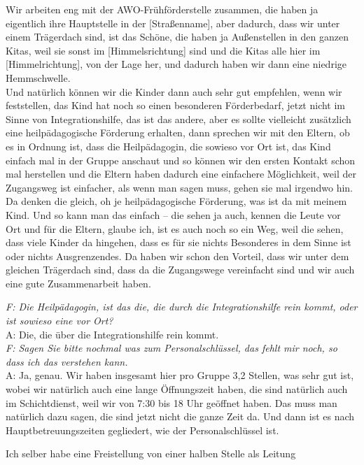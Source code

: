 \begin{linenumbers*}
Wir arbeiten eng mit der AWO-Frühförderstelle zusammen, die haben ja eigentlich ihre Hauptstelle in der [Straßenname], aber dadurch, dass wir unter einem Trägerdach sind, ist das Schöne, die haben ja Außenstellen in den ganzen Kitas, weil sie sonst im [Himmelsrichtung] sind und die Kitas alle hier im [Himmelrichtung], von der Lage her, und dadurch haben wir dann eine niedrige Hemmschwelle.\\
Und natürlich können wir die Kinder dann auch sehr gut empfehlen, wenn wir feststellen, das Kind hat noch so einen besonderen Förderbedarf, jetzt nicht im Sinne von Integrationshilfe, das ist das andere, aber es sollte vielleicht zusätzlich eine heilpädagogische Förderung erhalten, dann sprechen wir mit den Eltern, ob es in Ordnung ist, dass die Heilpädagogin, die sowieso vor Ort ist, das Kind einfach mal in der Gruppe anschaut und so können wir den ersten Kontakt schon mal herstellen und die Eltern haben dadurch eine einfachere Möglichkeit, weil der Zugangsweg ist einfacher, als wenn man sagen muss, gehen sie mal irgendwo hin.\\
Da denken die gleich, oh je heilpädagogische Förderung, was ist da mit meinem Kind. Und so kann man das einfach -- die sehen ja auch, kennen die Leute vor Ort und für die Eltern, glaube ich, ist es auch noch so ein Weg, weil die sehen, dass viele Kinder da hingehen, dass es für sie nichts Besonderes in dem Sinne ist oder nichts Ausgrenzendes. Da haben wir schon den Vorteil, dass wir unter dem gleichen Trägerdach sind, dass da die Zugangswege vereinfacht sind und wir auch eine gute Zusammenarbeit haben. 

\emph{F: Die Heilpädagogin, ist das die, die durch die Integrationshilfe rein kommt, oder ist sowieso eine vor Ort?}\\
A: Die, die über die Integrationshilfe rein kommt.\\

\emph{F: Sagen Sie bitte nochmal was zum Personalschlüssel, das fehlt mir noch, so dass ich das verstehen kann.}\\
A: Ja, genau. Wir haben insgesamt hier pro Gruppe 3,2 Stellen, was sehr gut ist, wobei wir natürlich auch eine lange Öffnungszeit haben, die sind natürlich auch im Schichtdienst, weil wir von 7:30 bis 18 Uhr geöffnet haben. Das muss man natürlich dazu sagen, die sind jetzt nicht die ganze Zeit da. Und dann ist es nach Hauptbetreuungszeiten gegliedert, wie der Personalschlüssel ist. 

Ich selber habe eine Freistellung von einer halben Stelle als Leitung 


\end{linenumbers*}

